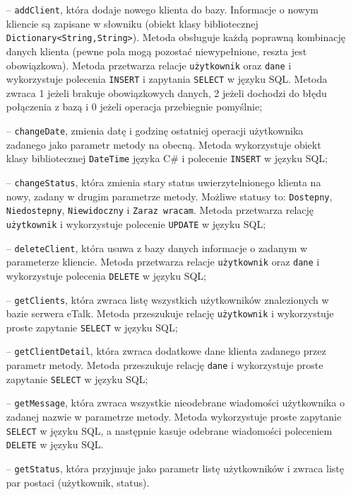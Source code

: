 \documentclass[a4paper,12pt]{article}
\begin{document}
\begin{itemize}
    \item[--] \texttt{addClient}, która dodaje nowego klienta do bazy. Informacje o nowym kliencie są zapisane w słowniku (obiekt klasy bibliotecznej \texttt{Dictionary<String,String>}). Metoda obsługuje każdą poprawną kombinację danych klienta (pewne pola mogą pozostać niewypełnione, reszta jest obowiązkowa).
        Metoda przetwarza relacje \texttt{użytkownik} oraz \texttt{dane} i wykorzystuje polecenia \texttt{INSERT} i zapytania \texttt{SELECT} w języku SQL. Metoda zwraca 1 jeżeli brakuje obowiązkowych danych, 2 jeżeli dochodzi do błędu połączenia z bazą i 0 jeżeli operacja przebiegnie pomyślnie;
    \item[--] \texttt{changeDate}, zmienia datę i godzinę ostatniej operacji użytkownika zadanego jako parametr metody na obecną.
              Metoda wykorzystuje obiekt klasy bibliotecznej \texttt{DateTime} języka C\# i polecenie \texttt{INSERT} w języku SQL;
    \item[--] \texttt{changeStatus}, która zmienia stary status uwierzytelnionego klienta na nowy, zadany w drugim parametrze metody. Możliwe statusy to: \texttt{Dostepny}, \texttt{Niedostepny}, \texttt{Niewidoczny} i \texttt{Zaraz wracam}. Metoda przetwarza relację \texttt{użytkownik} i wykorzystuje polecenie \texttt{UPDATE} w języku SQL;
    \item[--] \texttt{deleteClient}, która usuwa z bazy danych informacje o zadanym w parameterze kliencie.
              Metoda przetwarza relacje \texttt{użytkownik} oraz \texttt{dane} i wykorzystuje polecenia \texttt{DELETE} w języku SQL;
    \item[--] \texttt{getClients}, która zwraca listę wszystkich użytkowników znalezionych w bazie serwera eTalk.
              Metoda przeszukuje relację \texttt{użytkownik} i wykorzystuje proste zapytanie \texttt{SELECT} w języku SQL;
    \item[--] \texttt{getClientDetail}, która zwraca dodatkowe dane klienta zadanego przez parametr metody.
              Metoda przeszukuje relację \texttt{dane} i wykorzystuje proste zapytanie \texttt{SELECT} w języku SQL;
    \item[--] \texttt{getMessage}, która zwraca wszystkie nieodebrane wiadomości użytkownika o zadanej nazwie w parametrze metody.
              Metoda wykorzystuje proste zapytanie \texttt{SELECT} w języku SQL, a następnie kasuje odebrane wiadomości poleceniem \texttt{DELETE} w języku SQL.
    \item[--] \texttt{getStatus}, która przyjmuje jako parametr listę użytkowników i zwraca listę par postaci (użytkownik, status).

\end{itemize}
\end{document}
